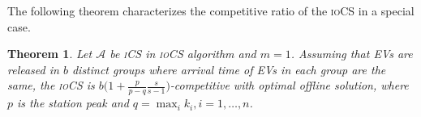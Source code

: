\documentclass[journal]{IEEEtran}
\newcommand{\ics}{\textsc{iCS}\xspace}
\newcommand{\iocs}{\textsc{ioCS}\xspace}
\newcommand{\opt}{\textsc{OPT}\xspace}
\newtheorem{thm}{Theorem}
\begin{document}

The following theorem characterizes the competitive ratio of the \iocs in a special case. 
\begin{thm}
\label{thm:iocscompetitive}
Let $\mathcal{A}$ be \ics in \iocs algorithm and $m=1$. Assuming that EVs are released in $b$ distinct groups where arrival time of EVs in each group are the same, the \iocs is $b\Big(1+\frac{p}{p-q}\frac{s}{s-1}\Big)$-competitive with optimal offline solution, where $p$ is the station peak and $q=\max_i k_i, i=1,\dots ,n$. 
\end{thm}


		
\end{document}

